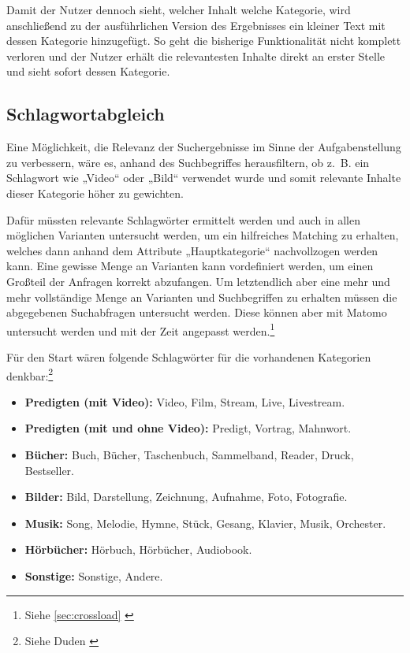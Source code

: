 Damit der Nutzer dennoch sieht, welcher Inhalt welche Kategorie, wird anschließend zu der ausführlichen Version des Ergebnisses ein kleiner Text mit dessen Kategorie hinzugefügt.
So geht die bisherige Funktionalität nicht komplett verloren und der Nutzer erhält die relevantesten Inhalte direkt an erster Stelle und sieht sofort dessen Kategorie.

\subsection{Schlagwortabgleich}
\label{sub:keyword}
Eine Möglichkeit, die Relevanz der Suchergebnisse im Sinne der Aufgabenstellung zu verbessern, wäre es, anhand des Suchbegriffes herausfiltern, ob z. B. ein Schlagwort wie „Video“ oder „Bild“ verwendet wurde und somit relevante Inhalte dieser Kategorie höher zu gewichten.

Dafür müssten relevante Schlagwörter ermittelt werden und auch in allen möglichen Varianten untersucht werden, um ein hilfreiches Matching zu erhalten, welches dann anhand dem Attribute „Hauptkategorie“ nachvollzogen werden kann.
Eine gewisse Menge an Varianten kann vordefiniert werden, um einen Großteil der Anfragen korrekt abzufangen.
Um letztendlich aber eine mehr und mehr vollständige Menge an Varianten und Suchbegriffen zu erhalten müssen die abgegebenen Suchabfragen untersucht werden.
Diese können aber mit Matomo untersucht werden und mit der Zeit angepasst werden.\footnote{Siehe \ref{sec:crossload} \cite{matomo2022}}

Für den Start wären folgende Schlagwörter für die vorhandenen Kategorien denkbar:\footnote{Siehe Duden \cite{dudensynonyme2022}}
\begin{itemize}
  \item \textbf{Predigten (mit Video):} Video, Film, Stream, Live, Livestream.
  \item \textbf{Predigten (mit und ohne Video):} Predigt, Vortrag, Mahnwort.
  \item \textbf{Bücher:} Buch, Bücher, Taschenbuch, Sammelband, Reader, Druck, Bestseller.
  \item \textbf{Bilder:} Bild, Darstellung, Zeichnung, Aufnahme, Foto, Fotografie.
  \item \textbf{Musik:} Song, Melodie, Hymne, Stück, Gesang, Klavier, Musik, Orchester.
  \item \textbf{Hörbücher:} Hörbuch, Hörbücher, Audiobook.
  \item \textbf{Sonstige:} Sonstige, Andere.
\end{itemize}

